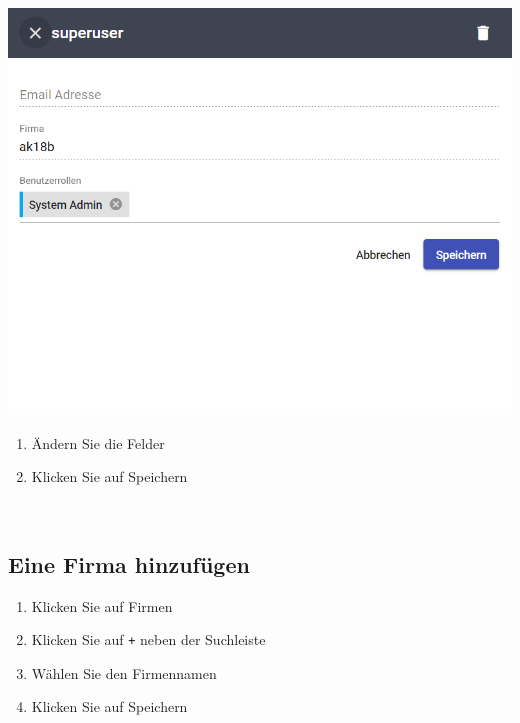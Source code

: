 \documentclass[11pt,a4paper]{report}
\begin{document}
	\begin{minipage}{0.4\linewidth}
	\includegraphics[scale=0.55]{Benutzeredit.png}
	\end{minipage}
	\hfill
	\begin{minipage}{0.4\linewidth}
	\begin{enumerate}[3]
		\item Ändern Sie die Felder
		\item Klicken Sie auf Speichern
	\end{enumerate}
	\end{minipage}\\

	\subsection{Eine Firma hinzufügen}
	
	\begin{enumerate}
		\item Klicken Sie auf \glqq{}Firmen\grqq{}
		\item Klicken Sie auf \texttt{+} neben der Suchleiste
		\item Wählen Sie den Firmennamen
		\item Klicken Sie auf Speichern
	\end{enumerate}\\
\end{document}
